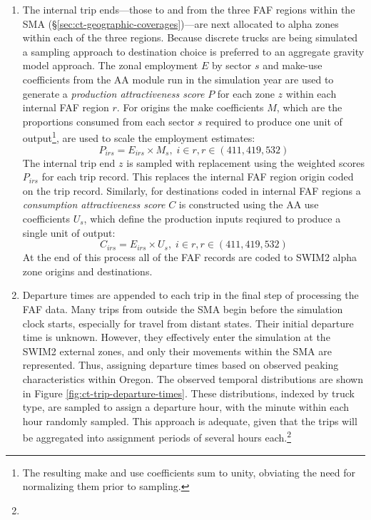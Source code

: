 \begin{enumerate}
    \item The internal trip ends---those to and from the three FAF regions within the SMA (\S\ref{sec:ct-geographic-coverages})---are next allocated to alpha zones within each of the three regions. Because discrete trucks are being simulated a sampling approach to destination choice is preferred to an aggregate gravity model approach. The zonal employment $E$ by sector $s$ and make-use coefficients from the AA module run in the simulation year are used to generate a \textit{production attractiveness score} $P$ for each zone $z$ within each internal FAF region $r$. For origins the make coefficients $M$, which are the proportions consumed from each sector $s$ required to produce one unit of output\footnote{The resulting make and use coefficients sum to unity, obviating the need for normalizing them prior to sampling.}, are used to scale the employment estimates:
    \begin{equation}
    P_{irs} = E_{irs} \times M_s, \; i \in r, r \in (411, 419, 532)
    \end{equation}
    The internal trip end $z$ is sampled with replacement using the weighted scores $P_{irs}$ for each trip record. This replaces the internal FAF region origin coded on the trip record. Similarly, for destinations coded in internal FAF regions a \textit{consumption attractiveness score} $C$ is constructed using the AA use coefficients $U_s$, which define the production inputs reqiured to produce a single unit of output:
    \begin{equation}
    C_{irs} = E_{irs} \times U_s, \; i \in r, r \in (411, 419, 532)
    \end{equation}
    At the end of this process all of the FAF records are coded to SWIM2 alpha zone origins and destinations.
    \item Departure times are appended to each trip in the final step of processing the FAF data. Many trips from outside the SMA begin before the simulation clock starts, especially for travel from distant states. Their initial departure time is unknown. However, they effectively enter the simulation at the SWIM2 external zones, and only their movements within the SMA are represented. Thus, assigning departure times based on observed peaking characteristics within Oregon. The observed temporal distributions are shown in Figure \ref{fig:ct-trip-departure-times}. These distributions, indexed by truck type, are sampled to assign a departure hour, with the minute within each hour randomly sampled. This approach is adequate, given that the trips will be aggregated into assignment periods of several hours each.\footnote{}
\end{enumerate} 

